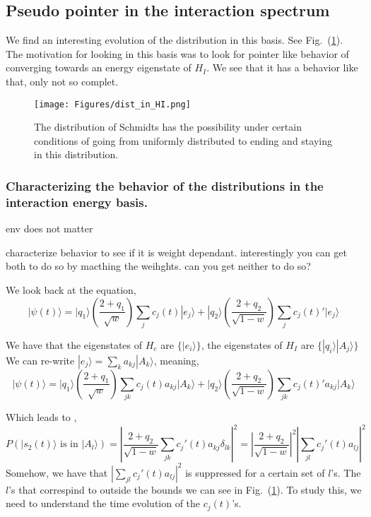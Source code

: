 \documentclass{article}
\begin{document}

\subsection{Pseudo pointer in the interaction spectrum}

We find an interesting evolution of the distribution in this basis. See Fig.~(\ref{fig:dis_in_HI}). The motivation for looking in this basis was to look for pointer like behavior of converging towards an energy eigenstate of $H_I$. We see that it has a behavior like that, only not so complet.

\begin{figure}
    \centering
    \texttt{[image: Figures/dist\_in\_HI.png]}
    \caption{The distribution of Schmidts has the possibility under certain conditions of going from uniformly distributed to ending and staying in this distribution.}
    \label{fig:dis_in_HI}
\end{figure}

\subsubsection{Characterizing the behavior of the distributions in the interaction energy basis.}


env does not matter



characterize behavior to see if it is weight dependant. 
interestingly you can get both to do so by macthing the weihghts. can you get neither to do so?

We look back at the equation,
\begin{equation}
    |\psi(t)\rangle=|q_1\rangle(\frac{2+q_1}{\sqrt{w}})\sum_jc_j(t)|e_j\rangle+|q_2\rangle(\frac{2+q_2}{\sqrt{1-w}})\sum_jc_j(t)'|e_j\rangle
\end{equation}

We have that the eigenstates of $H_e$ are $\{|e_i\rangle\}$, the eigenstates of $H_I$ are $\{|q_i\rangle|A_j\rangle\}$ We can re-write $ |e_j\rangle= \sum_ka_{kj}|A_k\rangle$, meaning,
\begin{equation}
    |\psi(t)\rangle=|q_1\rangle(\frac{2+q_1}{\sqrt{w}})\sum_{jk}c_j(t)a_{kj}|A_k\rangle+|q_2\rangle(\frac{2+q_2}{\sqrt{1-w}})\sum_{jk}c_j(t)'a_{kj}|A_k\rangle
\end{equation}

Which leads to ,
\begin{equation}
    P(|s_2(t)\rangle \text{ is in } |A_l\rangle) = |\frac{2+q_2}{\sqrt{1-w}}\sum_{jk}c_j'(t)a_{kj}\delta_{lk}|^2 = |\frac{2+q_2}{\sqrt{1-w}}|^2|\sum_{jl}c_j'(t)a_{lj}|^2
\end{equation}
Somehow, we have that $|\sum_{jl}c_j'(t)a_{lj}|^2$ is suppressed for a certain set of $l$'s. The $l$'s that correspind to outside the bounds we can see in Fig.~(\ref{fig:dis_in_HI}). To study this, we need to understand the time evolution of the $c_j(t)$'s.
\end{document}
